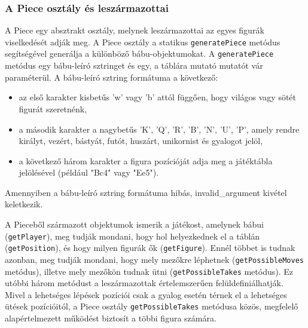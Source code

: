 \documentclass[12pt, twoside]{report}
\begin{document}
\subsubsection{A Piece osztály és leszármazottai}

A Piece egy absztrakt osztály, melynek leszármazottai  az egyes figurák viselkedését adják meg. A Piece osztály a statikus {\tt generatePiece} metódus segítségével generálja a különböző bábu-objektumokat. A {\tt generatePiece} metódus egy bábu-leíró sztringet és egy, a táblára mutató mutatót vár paraméterül. A bábu-leíró sztring formátuma a következő:
\begin{itemize}
	\item az első karakter kisbetűs 'w' vagy 'b' attól függően, hogy világos vagy sötét figurát szeretnénk,
	\item a második karakter a nagybetűs 'K', 'Q', 'R', 'B', 'N', 'U', 'P', amely rendre királyt, vezért, bástyát, futót, huszárt, unikornist és gyalogot jelöl,
	\item a következő három karakter a figura pozícióját adja meg a játéktábla jelölésével (például "Bc4" vagy "Ee5").
\end{itemize}
Amennyiben a bábu-leíró sztring formátuma hibás, invalid\_argument kivétel keletkezik.

A Pieceből származott objektumok ismerik a játékost, amelynek bábui ({\tt getPlayer}), meg tudják mondani, hogy hol helyezkednek el a táblán ({\tt getPosition}), és hogy milyen figurák ők ({\tt getFigure}). Ennél többet is tudnak azonban, meg tudják mondani, hogy mely mezőkre léphetnek ({\tt getPossibleMoves} metódus), illetve mely mezőkön tudnak ütni ({\tt getPossibleTakes} metódus). Ez utóbbi három metódust a leszármazottak értelemszerűen felüldefiniálhatják. Mivel a lehetséges lépések pozíciói csak a gyalog esetén térnek el a lehetséges ütések pozícióitól, a Piece osztály {\tt getPossibleTakes} metódusa közös, megfelelő alapértelmezett működést biztosít a többi figura számára.
\end{document}
